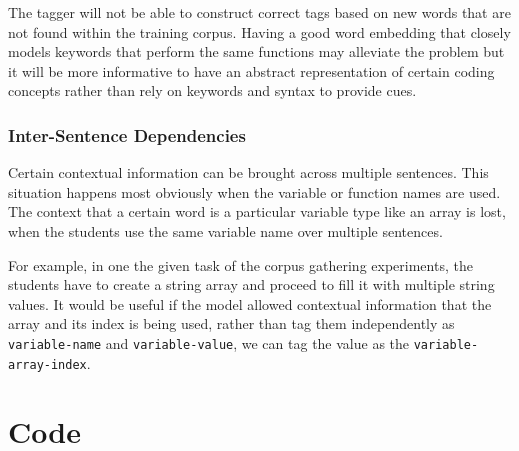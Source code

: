 \documentclass[fyp]{socreport}
\begin{document}
The tagger will not be able to construct correct tags based on new words that
are not found within the training corpus. Having a good word embedding that
closely models keywords that perform the same functions may alleviate the problem
but it will be more informative to have an abstract representation of certain
coding concepts rather than rely on keywords and syntax to provide cues.


\subsection{Inter-Sentence Dependencies}
Certain contextual information can be brought across multiple sentences. This
situation happens most obviously when the variable or function names are used.
The context that a certain word is a particular variable type like an array is
lost, when the students use the same variable name over multiple sentences.

For example, in one the given task of the corpus gathering experiments, the
students have to create a string array and proceed to fill it with multiple
string values. It would be useful if the model allowed contextual information
that the array and its index is being used, rather than tag them independently
as \texttt{variable-name} and \texttt{variable-value}, we can tag the value as
the \texttt{variable-array-index}.


\printbibliography[title={Whole bibliography}]

\appendix
\chapter{Code}
\end{document}
